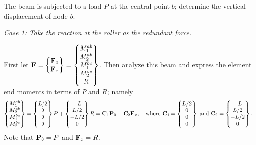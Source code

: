 \begin{example}[Beam]
The beam is subjected to a load $P$ at the central point $b$; determine the vertical displacement of node $b$.
\begin{fig}
  
\end{fig}
\emph{Case 1: Take the reaction at the roller as the redundant force.}
\begin{fig}
  
\end{fig}
First let $\mathbf{F} = \begin{Bmatrix}\mathbf{F}_0\\ \mathbf{F}_x\end{Bmatrix} = \begin{Bmatrix}M_1^{ab}\\ M_2^{ab}\\ M_1^{bc}\\ M_2^{bc}\\ R\end{Bmatrix}$. Then analyze this beam and express the element end moments in terms of $P$ and $R$; namely
\begin{equation*}
  \begin{Bmatrix}M_1^{ab}\\ M_2^{ab}\\ M_1^{bc}\\ M_2^{bc}\end{Bmatrix} = \begin{Bmatrix}L/2\\ 0\\ 0\\ 0\end{Bmatrix}P + \begin{Bmatrix}-L\\ L/2\\ -L/2\\ 0\end{Bmatrix}R = \mathbf{C}_1\mathbf{P}_0 + \mathbf{C}_2\mathbf{F}_x,\quad\text{where } \mathbf{C}_1 = \begin{Bmatrix}L/2\\ 0\\ 0\\ 0\end{Bmatrix}\text{ and } \mathbf{C}_2 = \begin{Bmatrix}-L\\ L/2\\ -L/2\\ 0\end{Bmatrix}.
\end{equation*}
Note that $\mathbf{P}_0 = P$ and $\mathbf{F}_x = R$.


\end{example}
